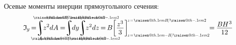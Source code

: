 \documentclass[14pt]{extarticle}
\makeatletter
\newcommand{\raisemath}[1]{\mathpalette{\raisem@th{#1}}}
\newcommand{\raisem@th}[3]{\raisebox{#1}{$#2#3$}}
\DeclareMathOperator*{\integral}{\scalerel*{\rotatebox{12}{$\!\textstyle\int\!$}}{\int}} %
\makeatother
\begin{document}
Осевые моменты инерции прямоугольного сечения:
\[\begin{gathered}
\mathfrak{I}_{\hspace{-0.1ex}\scalebox{.8}{$y$}} \hspace{-0.25ex}
=\hspace{-0.6ex}
\integral_{A} \hspace{-0.7ex} z^2 dA \hspace{-0.1ex}
=\hspace{-0.6ex}
\integral_{\mathclap{\hspace{-.4ex} \scalebox{.6}{$ \raisemath{.1em}{-B} \hspace{-.25ex} / \hspace{-.1ex} \raisemath{-.1em}{2} $}}}^{\mathclap{\scalebox{.6}{$ \raisemath{.1em}{B} \hspace{-.25ex} / \hspace{-.1ex} \raisemath{-.1em}{2} $}}} \hspace{-0.7ex} dy \hspace{-.4ex}
\integral_{\mathclap{\hspace{-.4ex} \scalebox{.6}{$ \raisemath{.1em}{-H} \hspace{-.3ex} / \hspace{-.1ex} \raisemath{-.1em}{2} $}}}^{\mathclap{\scalebox{.6}{$ \raisemath{.1em}{H} \hspace{-.3ex} / \hspace{-.1ex} \raisemath{-.1em}{2} $}}} \hspace{-0.7ex} z^2 dz \hspace{-0.2ex}
=\hspace{-0.25ex}
B \hspace{-.45ex} \left[ \displaystyle\frac{\raisebox{-.15em}{$ z^3 $}}{3} \hspace{.1ex} \right]_{\hspace{-.25ex}\scalebox{.6}{$ z \!=\! \raisemath{.1em}{-H} \hspace{-.3ex} / \hspace{-.1ex} \raisemath{-.1em}{2} $}}^{\hspace{-.25ex} \scalebox{.6}{$ z \!=\! \raisemath{.1em}{H} \hspace{-.3ex} / \hspace{-.1ex} \raisemath{-.1em}{2} $}} \hspace{-.8ex}
=\hspace{-0.1ex}
\displaystyle\frac{\raisebox{-0.18em}{$B \hspace{-0.1ex} H^{\hspace{.1ex}3}$}}{12} \hspace{-.1ex}

\end{gathered}\]
\end{document}
